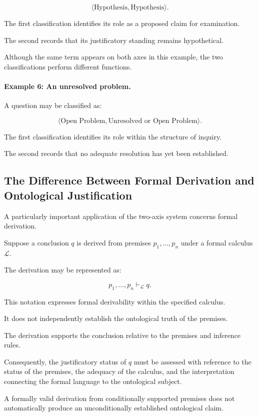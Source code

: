 \[
    \langle
        \text{Hypothesis},
        \text{Hypothesis}
    \rangle.
\]

The first
classification
identifies
its role
as a proposed
claim for
examination.

The second
records that
its justificatory
standing remains
hypothetical.

Although the
same term
appears on
both axes
in this example,
the two
classifications
perform different
functions.

\paragraph{Example 6: An unresolved problem.}

A question
may be classified
as:

\[
    \langle
        \text{Open Problem},
        \text{Unresolved or Open Problem}
    \rangle.
\]

The first
classification
identifies
its role
within the
structure of
inquiry.

The second
records that
no adequate
resolution
has yet
been established.

\subsection{The Difference Between Formal Derivation and Ontological Justification}

A particularly
important application
of the two-axis
system concerns
formal derivation.

Suppose a
conclusion \(q\)
is derived
from premises
\(p_1,\ldots,p_n\)
under a
formal calculus
\(\mathcal{L}\).

The derivation
may be represented
as:

\[
    p_1,\ldots,p_n
    \vdash_{\mathcal{L}} q.
\]

This notation
expresses formal
derivability
within the
specified calculus.

It does
not independently
establish the
ontological truth
of the premises.

The derivation
supports the
conclusion
relative to
the premises
and inference
rules.

Consequently,
the justificatory
status of
\(q\) must
be assessed
with reference
to the status
of the premises,
the adequacy
of the calculus,
and the
interpretation
connecting the
formal language
to the ontological
subject.

A formally
valid derivation
from conditionally
supported premises
does not
automatically
produce an
unconditionally
established
ontological claim.

